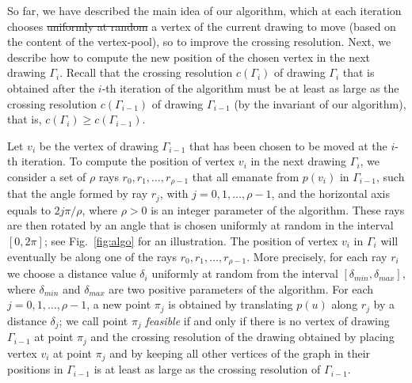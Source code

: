 \documentclass{comjnl}
\providecommand{\DIFdeltex}[1]{{\protect\color{red}\sout{#1}}}                      %
\providecommand{\DIFdelbegin}{} %
\providecommand{\DIFdelend}{} %
\providecommand{\DIFdel}[1]{\texorpdfstring{\DIFdeltex{#1}}{}} %
\newcommand{\DIFscaledelfig}{0.5}
\newlength{\DIFdelgraphicswidth} %
\newlength{\DIFdelgraphicsheight} %
\newcommand{\DIFdelincludegraphics}[2][]{%
\sbox{\DIFdelgraphicsbox}{\DIFOincludegraphics[#1]{#2}}%
\settoboxwidth{\DIFdelgraphicswidth}{\DIFdelgraphicsbox} %
\settoboxtotalheight{\DIFdelgraphicsheight}{\DIFdelgraphicsbox} %
\scalebox{\DIFscaledelfig}{%
\parbox[b]{\DIFdelgraphicswidth}{\usebox{\DIFdelgraphicsbox}\\[-\baselineskip] \rule{\DIFdelgraphicswidth}{0em}}\llap{\resizebox{\DIFdelgraphicswidth}{\DIFdelgraphicsheight}{%
\setlength{\unitlength}{\DIFdelgraphicswidth}%
\begin{picture}(1,1)%
\thicklines\linethickness{2pt} %
{\color[rgb]{1,0,0}\put(0,0){\framebox(1,1){}}}%
{\color[rgb]{1,0,0}\put(0,0){\line( 1,1){1}}}%
{\color[rgb]{1,0,0}\put(0,1){\line(1,-1){1}}}%
\end{picture}%
}\hspace*{3pt}}} %
} %
\DeclareRobustCommand{\DIFdelbegin}{\DIFOdelbegin \let\includegraphics\DIFdelincludegraphics} %
\DeclareRobustCommand{\DIFdelend}{\DIFOaddend \let\includegraphics\DIFOincludegraphics} %
\begin{document}
So far, we have described the main idea of our algorithm, which at each iteration chooses  \DIFdelbegin \DIFdel{uniformly at random }\DIFdelend a vertex of the current drawing to move (based on the content of the vertex-pool), so to improve the crossing resolution. Next, we describe how to compute the new position of the chosen vertex in the next drawing $\Gamma_i$. Recall that the crossing resolution $c(\Gamma_{i})$ of drawing $\Gamma_{i}$ that is obtained after the $i$-th iteration of the algorithm must be at least as large as the crossing resolution $c(\Gamma_{i-1})$ of drawing $\Gamma_{i-1}$ (by the invariant of our algorithm), that is, $c(\Gamma_i) \ge c(\Gamma_{i-1})$. 

Let $v_i$ be the vertex of drawing $\Gamma_{i-1}$ that has been chosen to be moved at the $i$-th iteration. To compute the position of vertex $v_i$ in the next drawing $\Gamma_i$, we consider a set of $\rho$ rays $r_0,r_1,\ldots,r_{\rho-1}$ that all emanate from $p(v_i)$ in $\Gamma_{i-1}$, such that the angle formed by ray $r_j$, with $j=0,1,\ldots,\rho-1$, and the horizontal axis equals to $2j\pi/\rho$, where $\rho>0$ is an integer parameter of the algorithm. These rays are then rotated by an angle that is chosen uniformly at random in the interval $[0,2\pi]$; see Fig.~\ref{fig:algo} for an illustration. The position of vertex $v_i$ in $\Gamma_i$ will eventually be along one of the rays $r_0,r_1,\ldots,r_{\rho-1}$. More precisely, for each ray $r_i$ we choose a distance value $\delta_i$ uniformly at random from the interval $[\delta_{min},\delta_{max}]$, where $\delta_{min}$ and $\delta_{max}$ are two positive parameters of the algorithm. For each $j=0,1,\ldots,\rho-1$, a new point $\pi_j$ is obtained by translating $p(u)$ along $r_j$ by a distance $\delta_j$; we call point $\pi_j$ \emph{feasible} if and only if there is no vertex of drawing $\Gamma_{i-1}$ at point $\pi_j$ and the crossing resolution of the drawing obtained by placing vertex $v_i$ at point $\pi_j$ and by keeping all other vertices of the graph in their positions in $\Gamma_{i-1}$ is at least as large as the crossing resolution of $\Gamma_{i-1}$.
\end{document}
